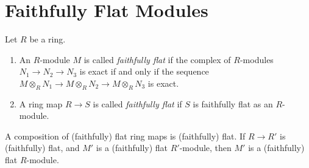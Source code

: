 %

\chapter{Faithfully Flat Modules}

\begin{definition}\cite[\href{https://stacks.math.columbia.edu/tag/00HB}{Definition 00HB}]{stacks-project}
	\label{definition-flat}
	Let $R$ be a ring.
	\begin{enumerate}
		
		\item An $R$-module $M$ is called {\it faithfully flat} if the
		complex of $R$-modules
		$N_1 \to N_2 \to N_3$ is exact if and only if
		the sequence $M \otimes_R N_1 \to M \otimes_R N_2 \to M \otimes_R N_3$
		is exact.
		
		\item A ring map $R \to S$ is called {\it faithfully flat} if
		$S$ is faithfully flat as an $R$-module.
	\end{enumerate}
\end{definition}

\begin{lemma}\cite[\href{https://stacks.math.columbia.edu/tag/00HC}{Lemma 00HC}]{stacks-project}
	\label{lemma-composition-flat}
	A composition of (faithfully) flat ring maps is
	(faithfully) flat.
	If $R \to R'$ is (faithfully) flat, and $M'$ is a
	(faithfully) flat $R'$-module, then $M'$ is a
	(faithfully) flat $R$-module.
\end{lemma}

